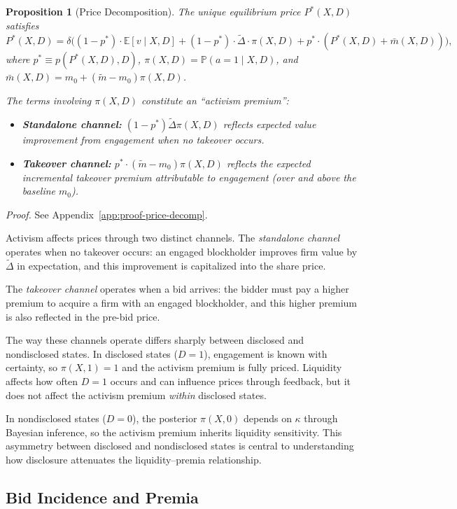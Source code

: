 \documentclass[11pt]{article}
\newtheorem{proposition}{Proposition}
\newcommand{\E}{\mathbb{E}}
\newcommand{\PP}{\mathbb{P}}
\newcommand{\1}{\mathbf{1}}
\begin{document}
\begin{proposition}[Price Decomposition]
\label{prop:price-decomp}
The unique equilibrium price $P^*(X,D)$ satisfies
\[
P^*(X,D) = \delta\Big((1-p^*) \cdot \E[v \mid X,D] + (1-p^*) \cdot \tilde{\Delta} \cdot \pi(X,D) + p^* \cdot (P^*(X,D) + \bar{m}(X,D))\Big),
\]
where $p^* \equiv p(P^*(X,D),D)$, $\pi(X,D) = \PP(a=1 \mid X,D)$, and $\bar{m}(X,D) = m_0 + (\tilde{m} - m_0)\pi(X,D)$.

The terms involving $\pi(X,D)$ constitute an ``activism premium'':
\begin{itemize}[leftmargin=1.5em,itemsep=0pt]
\item \textbf{Standalone channel:} $(1-p^*)\tilde{\Delta}\pi(X,D)$ reflects expected value improvement from engagement when no takeover occurs.
\item \textbf{Takeover channel:} $p^* \cdot (\tilde{m}-m_0)\pi(X,D)$ reflects the expected \emph{incremental} takeover premium attributable to engagement (over and above the baseline $m_0$).
\end{itemize}
\end{proposition}
\textit{Proof.} See Appendix~\ref{app:proof-price-decomp}.

Activism affects prices through two distinct channels. The \emph{standalone channel} operates when no takeover occurs: an engaged blockholder improves firm value by $\tilde{\Delta}$ in expectation, and this improvement is capitalized into the share price.

The \emph{takeover channel} operates when a bid arrives: the bidder must pay a higher premium to acquire a firm with an engaged blockholder, and this higher premium is also reflected in the pre-bid price.

The way these channels operate differs sharply between disclosed and nondisclosed states. In disclosed states ($D=1$), engagement is known with certainty, so $\pi(X,1)=1$ and the activism premium is fully priced. Liquidity affects how often $D=1$ occurs and can influence prices through feedback, but it does not affect the activism premium \emph{within} disclosed states.

In nondisclosed states ($D=0$), the posterior $\pi(X,0)$ depends on $\kappa$ through Bayesian inference, so the activism premium inherits liquidity sensitivity. This asymmetry between disclosed and nondisclosed states is central to understanding how disclosure attenuates the liquidity--premia relationship.

%
\subsection{Bid Incidence and Premia}
%
\end{document}
